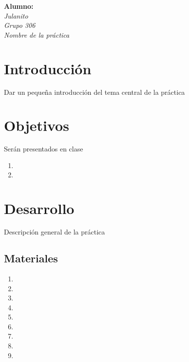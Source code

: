 \documentclass[letterpaper,12pt]{extarticle}%
\begin{document}
    \newpage
    \tableofcontents
    \newpage
    
    \begin{center}
    \textbf{ Alumno:}\\[3mm]
    {\it Julanito}\\[3mm]
    {\it Grupo 306}\\[3mm]
    {\it Nombre de la práctica}\\[3mm]
    \end{center}
    
    \begin{multicols}{2}
    \section{Introducción}
    
    Dar un pequeña introducción del tema central de la práctica
        
    \section{Objetivos}

	Serán presentados en clase    
    
    \begin{enumerate}
    \item 
    \item
    \end{enumerate}
		
	\section{Desarrollo}
	
	Descripción general de la práctica
	
	\subsection{Materiales}	
	
	\begin{enumerate}
	    \item 
	    \item 
	    \item 
	    \item 
	    \item 
	    \item 
	    \item 
	    \item 
	    \item 
	\end{enumerate}
	

\end{multicols}
\end{document}
